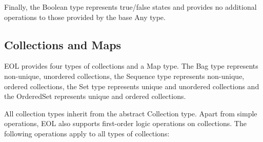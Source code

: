 Finally, the Boolean type represents true/false states and provides no additional operations to those provided by the base Any type.

\subsection{Collections and Maps} 
\label{sec:Design.EOL.Collections}

EOL provides four types of collections and a Map type. The Bag type represents non-unique, unordered collections, the Sequence type represents non-unique, ordered collections, the Set type represents unique and unordered collections and the OrderedSet represents unique and ordered collections.

All collection types inherit from the abstract Collection type. Apart from simple operations, EOL also supports first-order logic operations on collections. The following operations apply to all types of collections:


